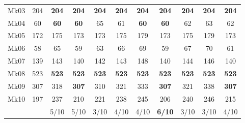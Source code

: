 \begin{table*}[!tb]
\begin{tabular}{rrccccccccc|}
    \multicolumn{1}{|c|}{Mk03} & \multicolumn{1}{c|}{204} & \multicolumn{1}{c|}{\textbf{204}} & \multicolumn{1}{c|}{\textbf{204}} & \multicolumn{1}{c|}{\textbf{204}} & \multicolumn{1}{c|}{\textbf{204}} & \multicolumn{1}{c|}{\textbf{204}} & \multicolumn{1}{c|}{\textbf{204}} & \multicolumn{1}{c|}{\textbf{204}} & \multicolumn{1}{c|}{\textbf{204}} & \textbf{204} \bigstrut\\
    \multicolumn{1}{|c|}{Mk04} & \multicolumn{1}{c|}{60} & \multicolumn{1}{c|}{\textbf{60}} & \multicolumn{1}{c|}{\textbf{60}} & \multicolumn{1}{c|}{65} & \multicolumn{1}{c|}{61} & \multicolumn{1}{c|}{\textbf{60}} & \multicolumn{1}{c|}{\textbf{60}} & \multicolumn{1}{c|}{62} & \multicolumn{1}{c|}{63} & 62 \bigstrut\\
    \multicolumn{1}{|c|}{Mk05} & \multicolumn{1}{c|}{172} & \multicolumn{1}{c|}{175} & \multicolumn{1}{c|}{173} & \multicolumn{1}{c|}{173} & \multicolumn{1}{c|}{175} & \multicolumn{1}{c|}{179} & \multicolumn{1}{c|}{173} & \multicolumn{1}{c|}{175} & \multicolumn{1}{c|}{179} & 173 \bigstrut\\
    \multicolumn{1}{|c|}{Mk06} & \multicolumn{1}{c|}{58} & \multicolumn{1}{c|}{65} & \multicolumn{1}{c|}{59} & \multicolumn{1}{c|}{63} & \multicolumn{1}{c|}{66} & \multicolumn{1}{c|}{69} & \multicolumn{1}{c|}{59} & \multicolumn{1}{c|}{67} & \multicolumn{1}{c|}{70} & 61 \bigstrut\\
    \multicolumn{1}{|c|}{Mk07} & \multicolumn{1}{c|}{139} & \multicolumn{1}{c|}{143} & \multicolumn{1}{c|}{140} & \multicolumn{1}{c|}{142} & \multicolumn{1}{c|}{143} & \multicolumn{1}{c|}{148} & \multicolumn{1}{c|}{140} & \multicolumn{1}{c|}{144} & \multicolumn{1}{c|}{146} & 140 \bigstrut\\
    \multicolumn{1}{|c|}{Mk08} & \multicolumn{1}{c|}{523} & \multicolumn{1}{c|}{\textbf{523}} & \multicolumn{1}{c|}{\textbf{523}} & \multicolumn{1}{c|}{\textbf{523}} & \multicolumn{1}{c|}{\textbf{523}} & \multicolumn{1}{c|}{\textbf{523}} & \multicolumn{1}{c|}{\textbf{523}} & \multicolumn{1}{c|}{\textbf{523}} & \multicolumn{1}{c|}{\textbf{523}} & \textbf{523} \bigstrut\\
    \multicolumn{1}{|c|}{Mk09} & \multicolumn{1}{c|}{307} & \multicolumn{1}{c|}{318} & \multicolumn{1}{c|}{\textbf{307}} & \multicolumn{1}{c|}{310} & \multicolumn{1}{c|}{321} & \multicolumn{1}{c|}{333} & \multicolumn{1}{c|}{\textbf{307}} & \multicolumn{1}{c|}{321} & \multicolumn{1}{c|}{338} & \textbf{307} \bigstrut\\
    \multicolumn{1}{|c|}{Mk10} & \multicolumn{1}{c|}{197} & \multicolumn{1}{c|}{237} & \multicolumn{1}{c|}{210} & \multicolumn{1}{c|}{221} & \multicolumn{1}{c|}{238} & \multicolumn{1}{c|}{245} & \multicolumn{1}{c|}{206} & \multicolumn{1}{c|}{240} & \multicolumn{1}{c|}{246} & 215 \bigstrut\\
    \hline
      \multicolumn{2}{c|}{}   & 5/10 & 5/10 & 3/10 & 4/10 & 4/10 & \textbf{6/10} & 3/10 & 3/10 & 4/10 \bigstrut\\
    \cline{3-11}
    \end{tabular}%
   \label{tab:resultDE}
\end{table*}%

